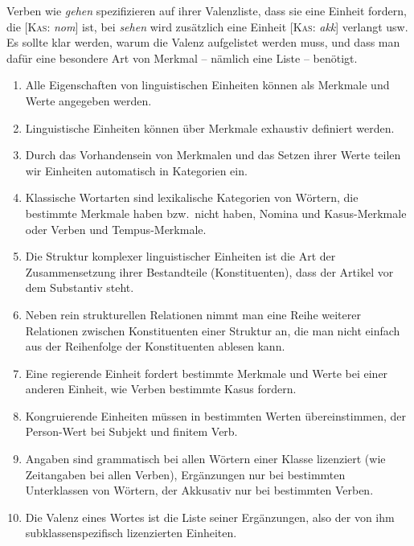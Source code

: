 Verben wie \textit{gehen} spezifizieren auf ihrer Valenzliste, dass sie eine Einheit fordern, die [\textsc{Kas}: \textit{nom}] ist, bei \textit{sehen} wird zusätzlich eine Einheit [\textsc{Kas}: \textit{akk}] verlangt usw.
Es sollte klar werden, warum die Valenz aufgelistet werden muss, und dass man dafür eine besondere Art von Merkmal -- nämlich eine Liste -- benötigt.

\Zusammenfassung

\begin{enumerate}
  \item Alle Eigenschaften von linguistischen Einheiten können als Merkmale und Werte angegeben werden.
  \item Linguistische Einheiten können über Merkmale exhaustiv definiert werden.
  \item Durch das Vorhandensein von Merkmalen und das Setzen ihrer Werte teilen wir Einheiten automatisch in Kategorien ein.
  \item Klassische Wortarten sind lexikalische Kategorien von Wörtern, die bestimmte Merkmale haben bzw.\ nicht haben, \zB Nomina und Kasus-Merk\-male oder Verben und Tempus-Merk\-male.
  \item Die Struktur komplexer linguistischer Einheiten ist die Art der Zusammensetzung ihrer Bestandteile (Konstituenten), \zB dass der Artikel vor dem Substantiv steht.
  \item Neben rein strukturellen Relationen nimmt man eine Reihe weiterer Relationen zwischen Konstituenten einer Struktur an, die man nicht einfach aus der Reihenfolge der Konstituenten ablesen kann.
  \item Eine regierende Einheit fordert bestimmte Merkmale und Werte bei einer anderen Einheit, wie \zB Verben bestimmte Kasus fordern.
  \item Kongruierende Einheiten müssen in bestimmten Werten übereinstimmen, \zB der Person-Wert bei Subjekt und finitem Verb.
  \item Angaben sind grammatisch bei allen Wörtern einer Klasse lizenziert (wie \zB Zeitangaben bei allen Verben), Ergänzungen nur bei bestimmten Unterklassen von Wörtern, \zB der Akkusativ nur bei bestimmten Verben.
  \item Die Valenz eines Wortes ist die Liste seiner Ergänzungen, also der von ihm subklassenspezifisch lizenzierten Einheiten.
\end{enumerate}

\WeitereLiteratur


